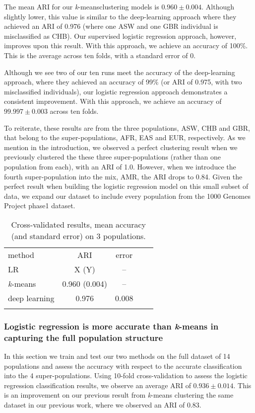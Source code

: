 \documentclass{llncs}
\newcommand{\kMeans}{\textit{k}-means}
\begin{document}
{The mean ARI for our \kMeans clustering models is \(0.960 \pm 0.004 \). Although slightly lower, this value is similar to the deep-learning approach
where they achieved an ARI of 0.976 (where one ASW and one GBR individual is misclassified as CHB). Our supervised logistic regression approach,
however, improves upon this result.  With this approach, we achieve an accuracy of 100\%. This is the average across
ten folds, with a standard error of 0.

Although we see two of our ten runs meet the accuracy of the deep-learning approach, where they achieved an accuracy of
99\% (or ARI of 0.975, with two misclassified individuals), our logistic regression approach demonstrates a consistent
improvement.  With this approach, we achieve an accuracy of \(99.997 \pm 0.003\) across ten folds.

To reiterate, these results are from the three populations, ASW, CHB and GBR, that belong to the super-populations, AFR,
EAS and EUR, respectively.  As we mention in the introduction, we observed a perfect clustering result when we previously clustered
the these three super-populations (rather than one population from each), with an ARI of 1.0. However, when
we introduce the fourth super-population into the mix, AMR, the ARI drops to 0.84.  Given the perfect result when building
the logistic regression model on this small subset of data, we expand our dataset to include every population from the
1000 Genomes Project phase1 dataset.


\begin{table}
\caption{Cross-validated results, mean accuracy (and standard error) on 3 populations.}
\begin{center}
\renewcommand{\arraystretch}{1.4}
\setlength\tabcolsep{3pt}
\begin{tabular}{lcccc}
\hline\noalign{\smallskip}
method  & ARI & error \\
LR  & X (Y) & -- \\
\kMeans & 0.960 (0.004) & -- \\
deep learning & 0.976 & 0.008 \\
\noalign{\smallskip}
\hline
\end{tabular}
\end{center}
\end{table}

\subsubsection{Logistic regression is more accurate than \kMeans{} in capturing the full population structure}
In this section we train and test our two methods on the full dataset of 14 populations and assess the accuracy with respect to the accurate
classification into the 4 super-populations.
Using 10-fold cross-validation to assess the logistic regression classification results, we observe an average ARI of \(0.936 \pm{} 0.014\).
This is an improvement on our previous result from \kMeans{} clustering the same dataset in our previous work, where we observed an ARI of \(0.83\).

}
\end{document}
